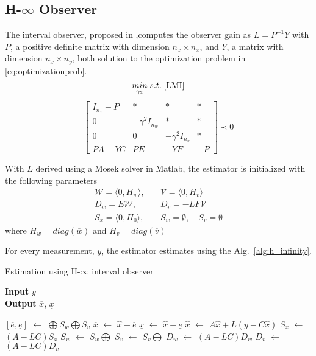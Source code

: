 \subsection{H-$\infty$ Observer}
The interval observer, proposed in \cite{Tang2019},computes the observer gain as $L= P^{-1}Y$ with $P$, a positive definite matrix with dimension $n_x \times n_x$, and $Y$, a matrix with dimension $n_x \times n_y$, both solution to the optimization problem in \eqref{eq:optimizationprob}.
\begin{equation}
\label{eq:optimizationprob}
\underset{\gamma _2}{min} \;
s.t. \; \eqref{LMI}
\end{equation} 
\begin{equation}
\label{LMI}
\left[\begin{matrix}
I_{n_x} -P & * & * & *\\
0 & -\gamma ^2 I_{n_w} & * &* \\
0 & 0 & -\gamma ^2 I_{n_v} & *\\
PA-YC & PE & -YF & -P
\end{matrix}\right]  \prec 0
\end{equation} 

With $L$ derived using a Mosek solver in Matlab\textsuperscript{\tiny\textregistered}, the estimator is initialized with the following parameters\\
\begin{equation}
\begin{split}
\mathcal{W} = \langle 0, H_w\rangle,& \quad \mathcal{V} = \langle 0,H_v\rangle\\
D_w = E\mathcal{W}, & \quad D_v = -LF\mathcal{V}\\
S_x= \langle 0, H_0\rangle, &\quad S_w = \emptyset,\quad S_v = \emptyset
\end{split}
\end{equation}
where $H_w = diag(\overline{w})$ and $H_v= diag(\overline{v})$

For every measurement, $y$, the estimator estimates using the Alg.~\ref{alg:h_infinity}.
\begin{algorithm}
		
        \caption{Estimation using H-$\infty$ interval observer}
        \textbf{Input} $y$\\
 		\textbf{Output} $\overline{x}$, $\underline{x}$
        \begin{algorithmic}[1]
        \State $[\overline{e}, \underline{e}]$ $\gets$ $\bigoplus S_w \bigoplus S_v$ \label{alg:main_constraints}
        \State $\overline{x}$ $\gets$ $\hat{x} + \overline{e}$
        \State $\underline{x}$ $\gets$ $\hat{x} + \underline{e}$
        \State $\hat{x}$ $\gets$ $A\hat{x} + L(y- C\hat{x})$ \label{alg:main_reac}
        \State $S_x$ $\gets$ $(A-LC)S_x$
        \State $S_w$ $\gets$ $S_w \bigoplus$ 
        \State $S_v$ $\gets$ $S_v \bigoplus$ 
        \State $D_w$ $\gets$ $(A-LC)D_w$
        \State $D_v$ $\gets$ $(A-LC)D_v$
        \end{algorithmic}
        \label{alg:h_infinity}
\end{algorithm}



